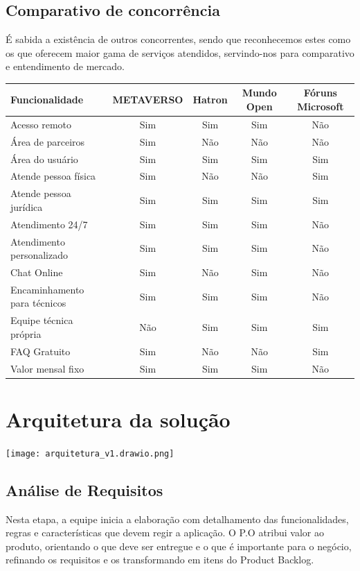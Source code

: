 \documentclass[
    12pt,               %
    openright,          %
    oneside,
    a4paper,            %
    MODELO,             %
    english,            %
    brazil              %
   ]{ifsp-spo-inf-ctds}
\begin{document}
    
    \section{Comparativo de concorrência}
    É sabida a existência de outros concorrentes, sendo que reconhecemos estes como os que oferecem maior gama de serviços atendidos, servindo-nos para comparativo e entendimento de mercado.
    
    \begin{table}
        \begin{tabular}{l c c c c}
            \hline
            Funcionalidade          & METAVERSO & Hatron & Mundo Open & Fóruns Microsoft \\
            \hline
            Acesso remoto           & Sim       & Sim   & Sim & Não \\
            Área de parceiros   & Sim   & Não   & Não & Não \\
            Área do usuário & Sim & Sim & Sim & Sim\\
            Atende pessoa física & Sim & Não & Não & Sim\\
            Atende pessoa jurídica & Sim & Sim & Sim & Sim\\
            Atendimento 24/7 & Sim & Sim & Sim & Não\\
            Atendimento personalizado & Sim & Sim & Sim & Não\\
            Chat Online & Sim & Não & Sim & Não\\
            Encaminhamento para técnicos & Sim & Sim & Sim & Não\\
            Equipe técnica própria & Não & Sim & Sim & Sim\\
            FAQ Gratuito & Sim & Não & Não & Sim\\
            Valor mensal fixo & Sim & Sim & Sim & Não\\
            \hline

        \end{tabular}
    \end{table}

\chapter[Arquitetura da solução]{Arquitetura da solução}


\texttt{[image: arquitetura\_v1.drawio.png]}

\section{Análise de Requisitos}
Nesta etapa, a equipe inicia a elaboração com detalhamento das funcionalidades, regras e características que devem regir a aplicação.
O P.O atribui valor ao produto, orientando o que deve ser entregue e o que é importante para o negócio, refinando os requisitos e os transformando em itens do Product Backlog.
\end{document}
